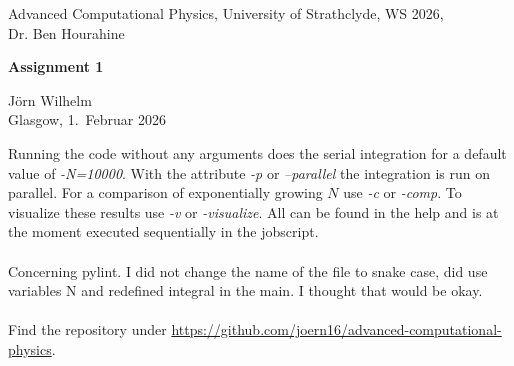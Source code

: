\documentclass[english, 10pt,a4paper,oneside,headinclude,footinclude,BCOR5mm]{scrartcl}
\begin{document}
\renewcommand{\sectionmark}[1]{\markright{\spacedlowsmallcaps{#1}}} 
\lehead{\mbox{\llap{\small\thepage\kern1em\color{halfgray} \vline}\color{halfgray}\hspace{0.5em}\rightmark\hfil}} 
\pagestyle{plain} 


\begin{center}
    \large Advanced Computational Physics, University of Strathclyde, WS 2026,\\ Dr. Ben Hourahine

    \vspace{0.5cm}

    {\LARGE\bfseries Assignment 1\par}

    \vspace{0.5cm}

    \large Jörn Wilhelm\\
    Glasgow, 1.\ Februar 2026

    \vspace{1cm}
\end{center}

\newcommand{\cancelblue}[2]{
  \textcolor{blue}{\cancelto{#1}{\textcolor{black}{#2}}}
}
\newcommand{\overblue}[2]{
  \textcolor{blue}{\overbrace{\textcolor{black}{#2}}^{#1}}
}
\newcommand{\underblue}[2]{
  \textcolor{blue}{\underbrace{\textcolor{black}{#2}}_{#1}}
}
\newcommand{\blue}[1]{\textcolor{blue}{#1}}
\newcommand{\red}[1]{\textcolor{red}{#1}}


\noindent
Running the code without any arguments does the serial integration for a default value of \textit{-N=10000}. With the attribute \textit{-p} or \textit{--parallel}
the integration is run on parallel. For a comparison of exponentially growing $N$ use \textit{-c} or \textit{-comp}.
To visualize these results use \textit{-v} or \textit{-visualize}. All can be found in the help and is at the moment executed sequentially in the jobscript.
\\\\
Concerning pylint. I did not change the name of the file to snake case, did use variables N and redefined integral in the main. I thought that would be okay.
\\\\
Find the repository under \url{https://github.com/joern16/advanced-computational-physics}.


%

\end{document}
